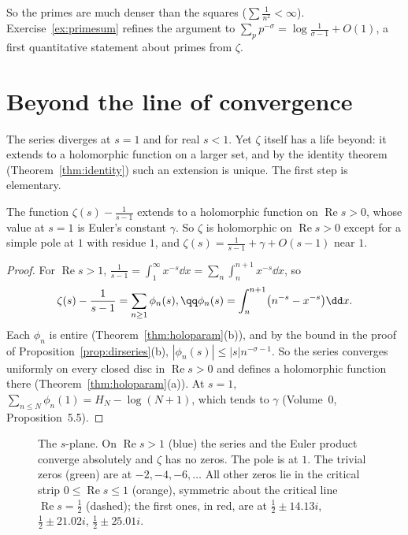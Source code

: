 So the primes are much denser than the squares ($\sum\frac1{n^2}<\infty$). Exercise~\ref{ex:primesum} refines the argument to
$\sum_pp^{-\sigma}=\log\frac1{\sigma-1}+O(1)$, a first quantitative statement about primes from $\zeta$.

\section{Beyond the line of convergence}

The series diverges at $s=1$ and for real $s<1$. Yet $\zeta$ itself has a life beyond: it extends to a holomorphic function on a
larger set, and by the identity theorem (Theorem~\ref{thm:identity}) such an extension is unique. The first step is elementary.

\begin{proposition}\label{prop:zetastrip}
The function $\zeta(s)-\frac1{s-1}$ extends to a holomorphic function on $\operatorname{Re}s>0$, whose value at $s=1$ is Euler's constant $\gamma$. So $\zeta$ is
holomorphic on $\operatorname{Re}s>0$ except for a simple pole at $1$ with residue $1$, and $\zeta(s)=\frac1{s-1}+\gamma+O(s-1)$ near $1$.
\end{proposition}
\begin{proof}
For $\operatorname{Re}s>1$, $\frac1{s-1}=\int_1^\infty x^{-s}\dd x=\sum_n\int_n^{n+1}x^{-s}\dd x$, so
\[
\begin{gathered}\zeta(s)-\frac1{s-1}=\sum_{n\ge1}\phi_n(s),\qq\phi_n(s)=\int_n^{n+1}\bigl(n^{-s}-x^{-s}\bigr)\dd x.\end{gathered}
\]
Each $\phi_n$ is entire (Theorem~\ref{thm:holoparam}(b)), and by the bound in the proof of Proposition~\ref{prop:dirseries}(b), $|\phi_n(s)|\le|s|n^{-\sigma-1}$. So the series
converges uniformly on every closed disc in $\operatorname{Re}s>0$ and defines a holomorphic function there (Theorem~\ref{thm:holoparam}(a)). At $s=1$,
$\sum_{n\le N}\phi_n(1)=H_N-\log(N+1)$, which tends to $\gamma$ (Volume~0, Proposition~5.5).
\end{proof}

\begin{figure}[ht]
\centering
{}
\caption{The $s$-plane. On $\operatorname{Re}s>1$ (blue) the series and the Euler product converge absolutely and $\zeta$ has no zeros. The pole is at $1$.
The trivial zeros (green) are at $-2,-4,-6,\dots$ All other zeros lie in the critical strip $0\le\operatorname{Re}s\le1$ (orange), symmetric about the critical
line $\operatorname{Re}s=\frac12$ (dashed); the first ones, in red, are at $\frac12\pm14.13i$, $\frac12\pm21.02i$, $\frac12\pm25.01i$.}
\label{fig:plane}
\end{figure}

